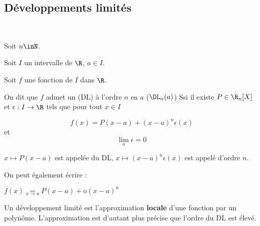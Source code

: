 \documentclass[12pt]{article}
\begin{document}






 


\subsection{Développements limités}

\begin{Def}~

Soit $n\inN$.

Soit $I$ un intervalle de $\R$, $a\in I$.

Soit $f$ une fonction de $I$ dans $\R$. 

On dit que $f$ admet un  (DL) à l'ordre $n$
en $a$ ($\DL_n(a)$) Ssi il existe $P \in \R_n[X]$ et $\epsilon :
I\rightarrow \R$ tels que pour tout $x\in I$

\begin{center}

 $$f(x)= P(x-a) + (x-a)^{n}\epsilon(x)$$ et 
 $$\lim_a \epsilon=0$$

\end{center}




$x\mapsto P(x-a)$ est appelée  du DL,
$x\mapsto (x-a)^{n}\epsilon(x)$ est appelé  d'ordre $n$.

On peut également écrire : 

$f(x)\underset{x\rightarrow a}{=} P(x-a) + \text{o}(x-a)^{n}$

\end{Def}

Un développement limité est l'approximation \textbf{locale} d'une fonction
par un polynôme. L'approximation est d'autant plus précise que l'ordre du
DL est élevé.
\end{document}
